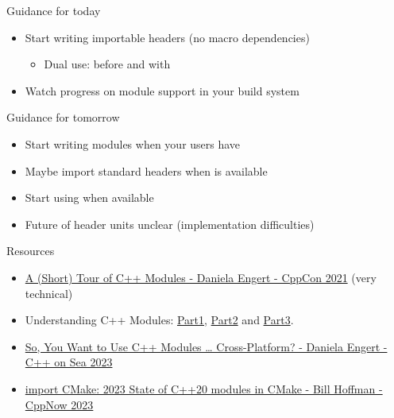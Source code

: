 \begin{frame}[fragile]
    \begin{exampleblock}{Guidance for today}
      \begin{itemize}
        \item Start writing importable headers (no macro dependencies)
        \begin{itemize}
          \item Dual use:  before  and  with 
        \end{itemize}
        \item Watch progress on module support in your build system
      \end{itemize}
    \end{exampleblock}
    \begin{exampleblock}{Guidance for tomorrow}
      \begin{itemize}
        \item Start writing modules when your users have 
        \item Maybe import standard headers when  is available
        \item Start using  when available
        \item Future of header units unclear (implementation difficulties)
      \end{itemize}
    \end{exampleblock}
\end{frame}

\begin{frame}[fragile]
    \begin{block}{Resources}
      \small
      \begin{itemize}
      \item \href{https://www.youtube.com/watch?v=nP8QcvPpGeM}{A (Short) Tour of C++ Modules - Daniela Engert - CppCon 2021} (very technical)
      \item Understanding C++ Modules: \href{https://vector-of-bool.github.io/2019/03/10/modules-1.html}{Part1}, \href{https://vector-of-bool.github.io/2019/03/31/modules-2.html}{Part2} and \href{https://vector-of-bool.github.io/2019/10/07/modules-3.html}{Part3}.
      \item \href{https://www.youtube.com/watch?v=DJTEUFRslbI}{So, You Want to Use C++ Modules … Cross-Platform? - Daniela Engert - C++ on Sea 2023}
      \item \href{https://www.youtube.com/watch?v=c563KgO-uf4&t=686s}{import CMake: 2023 State of C++20 modules in CMake - Bill Hoffman - CppNow 2023}
      \end{itemize}
    \end{block}
\end{frame}

